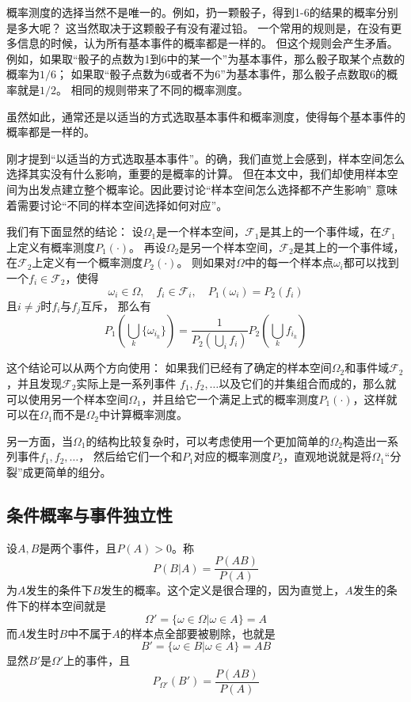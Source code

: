 \documentclass[UTF8, a4paper]{ctexart}
\begin{document}
概率测度的选择当然不是唯一的。例如，扔一颗骰子，得到1-6的结果的概率分别是多大呢？
这当然取决于这颗骰子有没有灌过铅。
一个常用的规则是，在没有更多信息的时候，认为所有基本事件的概率都是一样的。
但这个规则会产生矛盾。例如，如果取“骰子的点数为1到6中的某一个”为基本事件，那么骰子取某个点数的概率为$1/6$；
如果取“骰子点数为6或者不为6”为基本事件，那么骰子点数取6的概率就是$1/2$。
相同的规则带来了不同的概率测度。

虽然如此，通常还是以适当的方式选取基本事件和概率测度，使得每个基本事件的概率都是一样的。

刚才提到“以适当的方式选取基本事件”。的确，我们直觉上会感到，样本空间怎么选择其实没有什么影响，重要的是概率的计算。
但在本文中，我们却使用样本空间为出发点建立整个概率论。因此要讨论“样本空间怎么选择都不产生影响”
意味着需要讨论“不同的样本空间选择如何对应”。

我们有下面显然的结论：
设$\Omega_1$是一个样本空间，$\mathcal{F}_1$是其上的一个事件域，在$\mathcal{F}_1$上定义有概率测度$P_1(\cdot)$。
再设$\Omega_2$是另一个样本空间，$\mathcal{F}_2$是其上的一个事件域，在$\mathcal{F}_2$上定义有一个概率测度$P_2(\cdot)$。
则如果对$\Omega$中的每一个样本点$\omega_i$都可以找到一个$f_i \in \mathcal{F}_2$，使得
\[
    \omega_i \in \Omega, \quad f_i \in \mathcal{F}_i, \quad P_1(\omega_i) = P_2(f_i)
\]
且$i \neq j$时$f_i$与$f_j$互斥，
那么有
\[
    P_1\left(\bigcup_{k} \{\omega_{i_k}\} \right) = \frac{1}{P_2\left( \bigcup_i f_i \right)}P_2\left( \bigcup_{k} f_{i_k} \right)
\]

这个结论可以从两个方向使用：
如果我们已经有了确定的样本空间$\Omega_2$和事件域$\mathcal{F}_2$，并且发现$\mathcal{F}_2$实际上是一系列事件
$f_1, f_2, \ldots$以及它们的并集组合而成的，那么就可以使用另一个样本空间$\Omega_1$，并且给它一个满足上式的概率测度$P_1(\cdot)$，这样就可以在$\Omega_1$而不是$\Omega_2$中计算概率测度。

另一方面，当$\Omega_1$的结构比较复杂时，可以考虑使用一个更加简单的$\Omega_2$构造出一系列事件$f_1, f_2, \ldots$，
然后给它们一个和$P_1$对应的概率测度$P_2$，直观地说就是将$\Omega_1$“分裂”成更简单的组分。

\subsection{条件概率与事件独立性}

设$A, B$是两个事件，且$P(A) > 0$。称
\[
    P(B|A) = \frac{P(AB)}{P(A)}
\]
为$A$发生的条件下$B$发生的概率。这个定义是很合理的，因为直觉上，$A$发生的条件下的样本空间就是
\[
    \Omega' = \{\omega \in \Omega | \omega \in A\} = A
\]
而$A$发生时$B$中不属于$A$的样本点全部要被剔除，也就是
\[
    B' = \{ \omega \in B | \omega \in A \} = AB
\]
显然$B'$是$\Omega'$上的事件，且
\[
    P_{\Omega'}(B') = \frac{P(AB)}{P(A)} 
\]
\end{document}
